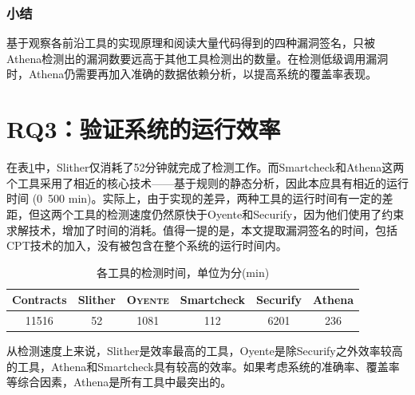 \subsubsection{小结}

基于观察各前沿工具的实现原理和阅读大量代码得到的四种漏洞签名，只被Athena检测出的漏洞数要远高于其他工具检测出的数量。在检测低级调用漏洞时，Athena仍需要再加入准确的数据依赖分析，以提高系统的覆盖率表现。

\section{RQ3：验证系统的运行效率}

在表\ref{tab:time_cost}中，Slither仅消耗了52分钟就完成了检测工作。而Smartcheck和Athena这两个工具采用了相近的核心技术——基于规则的静态分析，因此本应具有相近的运行时间 (0~500 min)。实际上，由于实现的差异，两种工具的运行时间有一定的差距，但这两个工具的检测速度仍然原快于Oyente和Securify，因为他们使用了约束求解技术，增加了时间的消耗。值得一提的是，本文提取漏洞签名的时间，包括CPT技术的加入，没有被包含在整个系统的运行时间内。

\begin{table}
  \centering
  \caption{各工具的检测时间，单位为分(min)}
  \begin{tabular}{cccccc}
    \toprule
    Contracts & Slither & \textsc{Oyente} & Smartcheck & Securify & Athena \\
    \midrule
    11516 & 52 & 1081 & 112 & 6201 & 236 \\
    \bottomrule
  \end{tabular}
  \label{tab:time_cost}
\end{table}

从检测速度上来说，Slither是效率最高的工具，Oyente是除Securify之外效率较高的工具，Athena和Smartcheck具有较高的效率。如果考虑系统的准确率、覆盖率等综合因素，Athena是所有工具中最突出的。